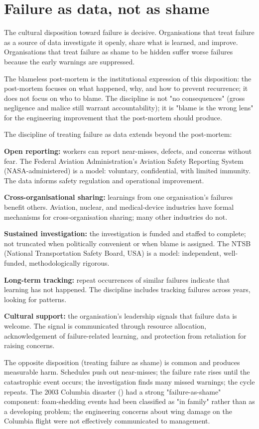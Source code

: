 \section{Failure as data, not as shame}

The cultural disposition toward failure is decisive. Organisations that treat failure as a source of data investigate it openly, share what is learned, and improve. Organisations that treat failure as shame to be hidden suffer worse failures because the early warnings are suppressed.

The blameless post-mortem is the institutional expression of this disposition: the post-mortem focuses on what happened, why, and how to prevent recurrence; it does not focus on who to blame. The discipline is not "no consequences" (gross negligence and malice still warrant accountability); it is "blame is the wrong lens" for the engineering improvement that the post-mortem should produce.

The discipline of treating failure as data extends beyond the post-mortem:

\textbf{Open reporting:} workers can report near-misses, defects, and concerns without fear. The Federal Aviation Administration's Aviation Safety Reporting System (NASA-administered) is a model: voluntary, confidential, with limited immunity. The data informs safety regulation and operational improvement.

\textbf{Cross-organisational sharing:} learnings from one organisation's failures benefit others. Aviation, nuclear, and medical-device industries have formal mechanisms for cross-organisation sharing; many other industries do not.

\textbf{Sustained investigation:} the investigation is funded and staffed to complete; not truncated when politically convenient or when blame is assigned. The NTSB (National Transportation Safety Board, USA) is a model: independent, well-funded, methodologically rigorous.

\textbf{Long-term tracking:} repeat occurrences of similar failures indicate that learning has not happened. The discipline includes tracking failures across years, looking for patterns.

\textbf{Cultural support:} the organisation's leadership signals that failure data is welcome. The signal is communicated through resource allocation, acknowledgement of failure-related learning, and protection from retaliation for raising concerns.

The opposite disposition (treating failure as shame) is common and produces measurable harm. Schedules push out near-misses; the failure rate rises until the catastrophic event occurs; the investigation finds many missed warnings; the cycle repeats. The 2003 Columbia disaster (\cite{acc:caib-columbia}) had a strong "failure-as-shame" component: foam-shedding events had been classified as "in family" rather than as a developing problem; the engineering concerns about wing damage on the Columbia flight were not effectively communicated to management.

